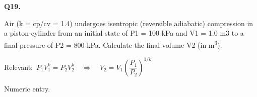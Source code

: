 \documentclass[11pt]{article}
\begin{document}
\vspace{9pt}
\filbreak
\textbf{\color{accent}Q19.}\quad {\small\color{soft}[D13-Q19 \textbullet\ Numeric \textbullet\ Isentropic process --- P1V1\textasciicircum{}k = P2V2\textasciicircum{}k, find compressed volume (SI)]}\par\vspace{2pt}
Air (k = cp/cv = 1.4) undergoes isentropic (reversible adiabatic) compression in a piston-cylinder from an initial state of P1 = 100 kPa and V1 = 1.0 m3 to a final pressure of P2 = 800 kPa. Calculate the final volume V2 (in m\textsuperscript{3}).\par\vspace{3pt}
{\small\color{soft}Relevant:}\ $P_1 V_1^k = P_2 V_2^k \quad \Rightarrow \quad V_2 = V_1 \left(\dfrac{P_1}{P_2}\right)^{1/k}$\par\vspace{3pt}
{\small\color{soft}Numeric entry.}\par\vspace{3pt}
\end{document}
